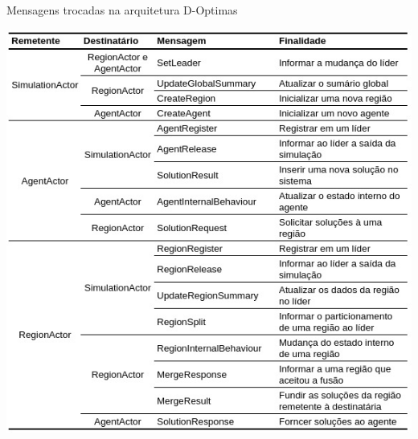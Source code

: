 \begin{quadro}[ht!]
    \centering
    \caption{Mensagens trocadas na arquitetura D-Optimas}
    \label{tab:mensagens}
    \includegraphics[scale=0.75]{imagens/tabela.jpeg}

\end{quadro}
